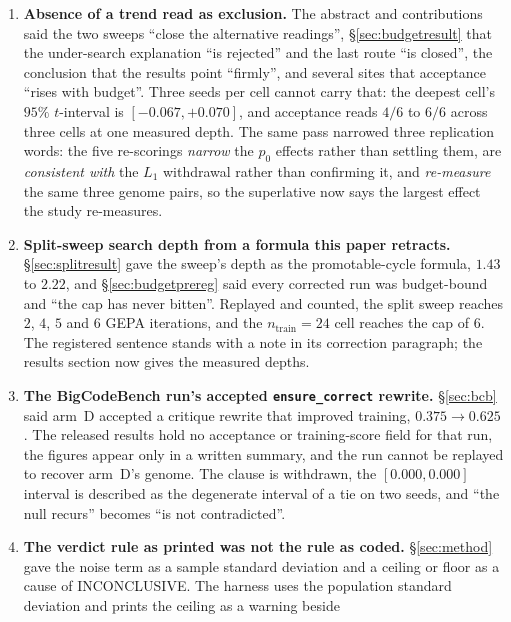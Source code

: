 \documentclass[11pt]{article}
\begin{document}
\begin{enumerate}
    variance the seed-level tests carry on multi-hard (task draws) and which nothing here carries
    (the optimizer's own).
  \item \textbf{Absence of a trend read as exclusion.} The abstract and contributions said the
    two sweeps ``close the alternative readings'', \S\ref{sec:budgetresult} that the under-search
    explanation ``is rejected'' and the last route ``is closed'', the conclusion that the results
    point ``firmly'', and several sites that acceptance ``rises with budget''. Three seeds per cell
    cannot carry that: the deepest cell's $95\%$ $t$-interval is $[-0.067,+0.070]$, and acceptance
    reads $4/6$ to $6/6$ across three cells at one measured depth. The same pass narrowed three
    replication words: the five re-scorings \emph{narrow} the $p_0$ effects rather than settling
    them, are \emph{consistent with} the $L_1$ withdrawal rather than confirming it, and
    \emph{re-measure} the same three genome pairs, so the superlative now says the largest effect
    the study re-measures.
  \item \textbf{Split-sweep search depth from a formula this paper retracts.} \S\ref{sec:splitresult}
    gave the sweep's depth as the promotable-cycle formula, $1.43$ to $2.22$, and
    \S\ref{sec:budgetprereg} said every corrected run was budget-bound and ``the cap has never
    bitten''. Replayed and counted, the split sweep reaches $2$, $4$, $5$ and $6$ GEPA iterations,
    and the $n_{\mathrm{train}}{=}24$ cell reaches the cap of $6$. The registered sentence stands
    with a note in its correction paragraph; the results section now gives the measured depths.
  \item \textbf{The BigCodeBench run's accepted \texttt{ensure\_correct} rewrite.}
    \S\ref{sec:bcb} said arm~D accepted a critique rewrite that improved training, $0.375\to0.625$.
    The released results hold no acceptance or training-score field for that run, the figures
    appear only in a written summary, and the run cannot be replayed to recover arm~D's genome.
    The clause is withdrawn, the $[0.000,0.000]$
    interval is described as the degenerate interval of a tie on two seeds, and ``the null
    recurs'' becomes ``is not contradicted''.
  \item \textbf{The verdict rule as printed was not the rule as coded.} \S\ref{sec:method} gave the
    noise term as a sample standard deviation and a ceiling or floor as a cause of INCONCLUSIVE.
    The harness uses the population standard deviation and prints the ceiling as a warning beside

\end{enumerate}
\end{document}
